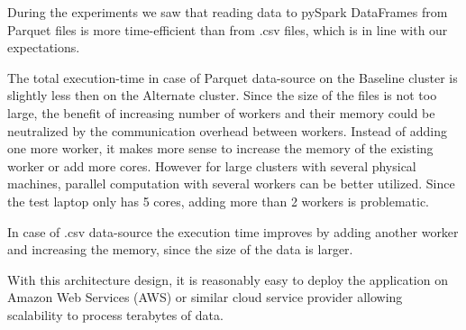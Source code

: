 During the experiments we saw that reading data to pySpark DataFrames from Parquet files is more time-efficient than from .csv files, which is in line with our expectations.

The total execution-time in case of Parquet data-source on the Baseline cluster is slightly less then on the Alternate cluster. Since the size of the files is not too large, the benefit of increasing number of workers and their memory could be neutralized by the communication overhead between workers. Instead of adding one more worker, it makes more sense to increase the memory of the existing worker or add more cores. However for large clusters with several physical machines, parallel computation with several workers can be better utilized. Since the test laptop only has 5 cores, adding more than 2 workers is problematic.

In case of .csv data-source the execution time improves by adding another worker and increasing the memory, since the size of the data is larger.

With this architecture design, it is reasonably easy to deploy the application on Amazon Web Services (AWS) or similar cloud service provider allowing scalability to process terabytes of data.